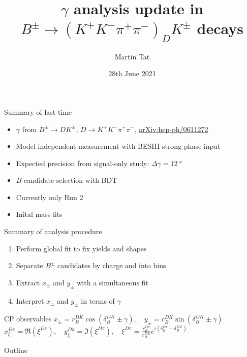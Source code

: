 \documentclass{beamer}
\title[$B^\pm\to(K^+K^-\pi^+\pi^-)_DK^\pm$]{\texorpdfstring{$\gamma$}{gamma} analysis update in \texorpdfstring{$B^\pm\to(K^+K^-\pi^+\pi^-)_DK^\pm$}{B to K+K-pi+pi-} decays}
\author{Martin Tat}
\institute{Oxford LHCb}
\date{28th June 2021}
\begin{document}
\begin{frame}
  \titlepage
\end{frame}

\begin{frame}{Summary of last time}
  \begin{itemize}
    \setlength\itemsep{1.5em}
    \item{$\gamma$ from $B^\pm\to DK^\pm$, $D\to K^+K^-\pi^+\pi^-$, \href{https://arxiv.org/abs/hep-ph/0611272}{arXiv:hep-ph/0611272}}
    \item{Model independent measurement with BESIII strong phase input}
    \item{Expected precision from signal-only study: $\Delta\gamma = \SI{12}{\degree}$}
    \item{$B$ candidate selection with BDT}
    \item{Currently only Run $2$}
    \item{Inital mass fits}
  \end{itemize}
\end{frame}

\begin{frame}{Summary of analysis procedure}
  \begin{enumerate}
    \setlength\itemsep{1.5em}
      \item{Perform global fit to fix yields and shapes}
      \item{Separate $B^\pm$ candidates by charge and into bins}
      \item{Extract $x_\pm$ and $y_\pm$ with a simultaneous fit}
      \item{Interpret $x_\pm$ and $y_\pm$ in terms of $\gamma$}
  \end{enumerate}
  \begin{block}{CP observables}
    $x_\pm = r_B^{DK}\cos(\delta_B^{DK}\pm\gamma), \quad y_\pm = r_B^{DK}\sin(\delta_B^{DK}\pm\gamma)$ \\
    $x_\xi^{D\pi} = \Re(\xi^{D\pi}), \quad y_\xi^{D\pi} = \Im(\xi^{D\pi}), \quad \xi^{D\pi} = \frac{r_B^{D\pi}}{r_B^{DK}}e^{i(\delta_B^{D\pi} - \delta_B^{DK})}$
  \end{block}
\end{frame}

\begin{frame}{Outline}
  \tableofcontents
\end{frame}
\end{document}
